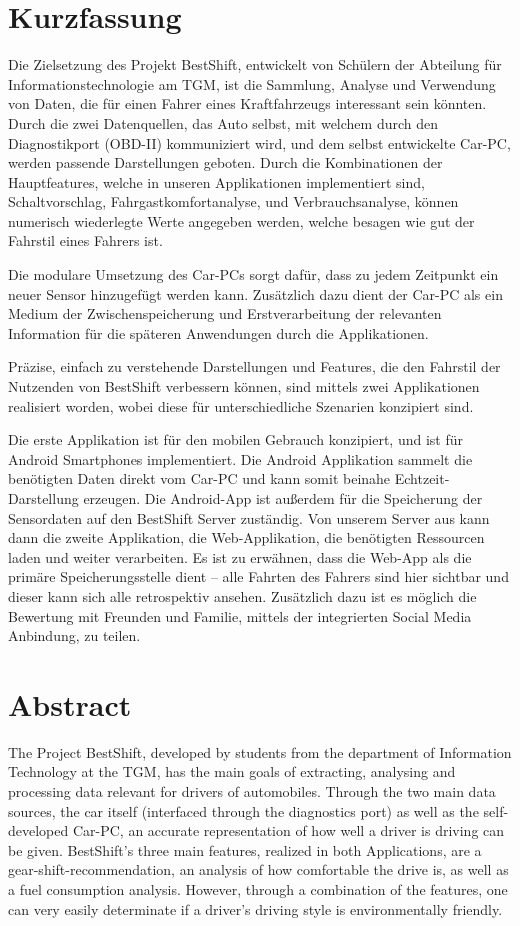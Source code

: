 \section*{Kurzfassung}

Die Zielsetzung des Projekt BestShift, entwickelt von Schülern der Abteilung für Informationstechnologie am TGM, ist die Sammlung, Analyse und Verwendung von Daten, die für einen Fahrer eines Kraftfahrzeugs interessant sein könnten. Durch die zwei Datenquellen, das Auto selbst, mit welchem durch den Diagnostikport (OBD-II) kommuniziert wird, und dem selbst entwickelte Car-PC, werden passende Darstellungen geboten. Durch die Kombinationen der Hauptfeatures, welche in unseren Applikationen implementiert sind, Schaltvorschlag, Fahrgastkomfortanalyse, und Verbrauchsanalyse, können numerisch wiederlegte Werte angegeben werden, welche besagen wie gut der Fahrstil eines Fahrers ist.

Die modulare Umsetzung des Car-PCs sorgt dafür, dass zu jedem Zeitpunkt ein neuer Sensor hinzugefügt werden kann. Zusätzlich dazu dient der Car-PC als ein Medium der Zwischenspeicherung und Erstverarbeitung der relevanten Information für die späteren Anwendungen durch die Applikationen. 

Präzise, einfach zu verstehende Darstellungen und Features, die den Fahrstil der Nutzenden von BestShift verbessern können, sind mittels zwei Applikationen realisiert worden, wobei diese für unterschiedliche Szenarien konzipiert sind. 

Die erste Applikation ist für den mobilen Gebrauch konzipiert, und ist für Android Smartphones implementiert. Die Android Applikation sammelt die benötigten Daten direkt vom Car-PC und kann somit beinahe Echtzeit-Darstellung erzeugen. Die Android-App ist außerdem für die Speicherung der Sensordaten auf den BestShift Server zuständig. Von unserem Server aus kann dann die zweite Applikation, die Web-Applikation, die benötigten Ressourcen laden und weiter verarbeiten. Es ist zu erwähnen, dass die Web-App als die primäre Speicherungsstelle dient – alle Fahrten des Fahrers sind hier sichtbar und dieser kann sich alle retrospektiv ansehen. Zusätzlich dazu ist es möglich die Bewertung mit Freunden und Familie, mittels der integrierten Social Media Anbindung, zu teilen. 

\section*{Abstract}

The Project BestShift, developed by students from the department of Information Technology at the TGM, has the main goals of extracting, analysing and processing data relevant for drivers of automobiles. Through the two main data sources, the car itself (interfaced through the diagnostics port) as well as the self-developed Car-PC, an accurate representation of how well a driver is driving can be given. BestShift’s three main features, realized in both Applications, are a gear-shift-recommendation, an analysis of how comfortable the drive is, as well as a fuel consumption analysis. However, through a combination of the features, one can very easily determinate if a driver’s driving style is environmentally friendly.

